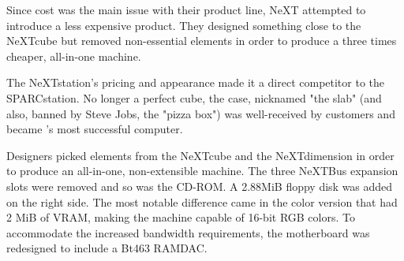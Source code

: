 Since cost was the main issue with their product line, NeXT attempted to introduce a less expensive product. They designed something close to the NeXTcube but removed non-essential elements in order to produce a three times cheaper, all-in-one machine.\\
\par
The NeXTstation's pricing and appearance made it a direct competitor to the SPARCstation. No longer a perfect cube, the case, nicknamed "the slab" (and also, banned by Steve Jobs, the "pizza box") was well-received by customers and became \NeXTns{}'s most successful computer.\\
\par 
{}
\par
\vspace{-10pt}
Designers picked elements from the NeXTcube and the NeXTdimension in order to produce an all-in-one, non-extensible machine. The three NeXTBus expansion slots were removed and so was the CD-ROM. A 2.88MiB floppy disk was added on the right side. The most notable difference came in the color version that had 2 MiB of VRAM, making the machine capable of 16-bit RGB colors. To accommodate the increased bandwidth requirements, the motherboard was redesigned to include a Bt463 RAMDAC.\\
\par




